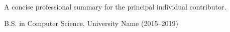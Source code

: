 \documentclass{resume}
\begin{document}
\begin{center}
  {\resumename}\\
  {\resumecontact}
\end{center}

A concise professional summary for the principal individual contributor.


\noindent B.S. in Computer Science, University Name (2015--2019)
\end{document}
